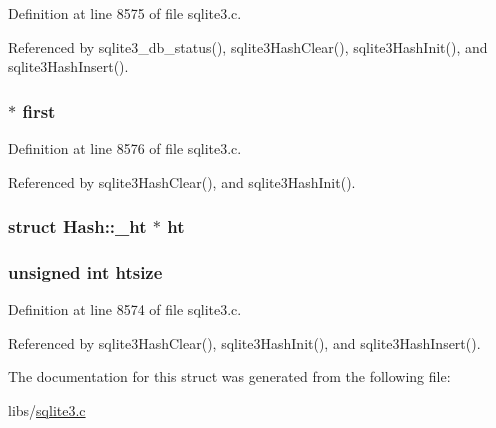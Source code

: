 Definition at line 8575 of file sqlite3.\+c.



Referenced by sqlite3\+\_\+db\+\_\+status(), sqlite3\+Hash\+Clear(), sqlite3\+Hash\+Init(), and sqlite3\+Hash\+Insert().

\hypertarget{struct_hash_a0ef775d37aa0a53eac8c6510b0518690}{}
\subsubsection[{first}]{$\ast$ first}\label{struct_hash_a0ef775d37aa0a53eac8c6510b0518690}


Definition at line 8576 of file sqlite3.\+c.



Referenced by sqlite3\+Hash\+Clear(), and sqlite3\+Hash\+Init().

\hypertarget{struct_hash_a38322464cd0d7254b9537661b4517e13}{}
\subsubsection[{ht}]{\setlength{\rightskip}{0pt plus 5cm}struct {\bf Hash\+::\+\_\+ht} $\ast$ ht}\label{struct_hash_a38322464cd0d7254b9537661b4517e13}
\hypertarget{struct_hash_abed0ad9dee175658dd89a564ca90ee4e}{}
\subsubsection[{htsize}]{\setlength{\rightskip}{0pt plus 5cm}unsigned int htsize}\label{struct_hash_abed0ad9dee175658dd89a564ca90ee4e}


Definition at line 8574 of file sqlite3.\+c.



Referenced by sqlite3\+Hash\+Clear(), sqlite3\+Hash\+Init(), and sqlite3\+Hash\+Insert().



The documentation for this struct was generated from the following file\+:\begin{DoxyCompactItemize}
\item 
libs/\hyperlink{sqlite3_8c}{sqlite3.\+c}\end{DoxyCompactItemize}
